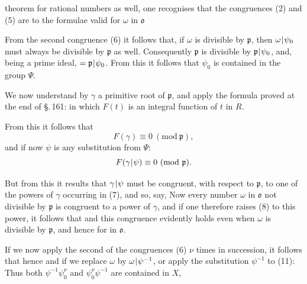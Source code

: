  theorem for rational numbers as well, one recognises that the congruences (2) and (5) are  to the formulae valid for  $\omega$ in $\mathfrak{o}$

From the second congruence (6) it follows that, if $\omega$ is divisible by $\mathfrak{p}$, then $\omega\mkern1mu|\mkern1mu\psi_0$ must always be divisible by $\mathfrak{p}$ as well. Consequently $\mathfrak{p}$ is divisible by $\mathfrak{p}\mkern1mu|\mkern1mu\psi_0$, and, being a prime ideal, $= \mathfrak{p}\mkern1mu|\mkern1mu\psi_0$. From this it follows that $\psi_0$ is contained in the group $\Psi$.

We now understand by $\gamma$ a primitive root of $\mathfrak{p}$, and apply the formula proved at the end of \S.\,161:
in which $F(t)$ is an integral function of $t$ in $R$.

From this it follows that
\[ F(\gamma) \equiv 0\ (\mathrm{mod}\ \mathfrak{p}), \]
and if now $\psi$ is any substitution from $\Psi$:
\[ F(\gamma\mkern1mu|\mkern1mu\psi) \equiv 0\ (\mathrm{mod}\ \mathfrak{p}). \]

But from this it results that $\gamma\mkern1mu|\mkern1mu\psi$ must be congruent, with respect to $\mathfrak{p}$, to one of the powers of $\gamma$ occurring in (7), and so, say,
Now every number $\omega$ in $\mathfrak{o}$ not divisible by $\mathfrak{p}$ is congruent to a power of $\gamma$, and if one therefore raises (8) to this power, it follows that
and this congruence evidently holds even when $\omega$ is divisible by $\mathfrak{p}$, and hence for  in $\mathfrak{o}$.

If we now apply the second of the congruences (6) $\nu$ times in succession, it follows that
hence
and if we replace $\omega$ by $\omega\mkern1mu|\mkern1mu\psi^{-1}$, or apply the substitution $\psi^{-1}$ to (11):
Thus both $\psi^{-1}\psi_0^\nu$ and $\psi_0^\nu\psi^{-1}$ are contained in $X$,
